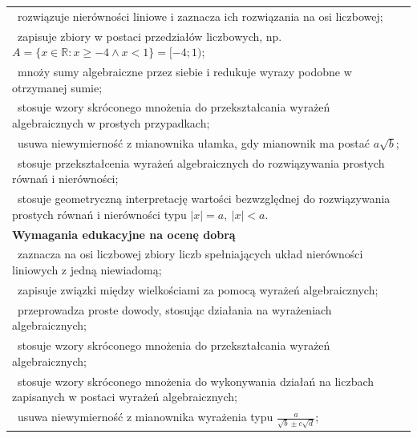 \documentclass[12pt,a4paper]{article}
\begin{document}
\begin{longtable}{|p{16cm}|}
		\textbullet\ rozwiązuje nierówności liniowe i zaznacza ich rozwiązania na osi liczbowej; \\
		
		\textbullet\ zapisuje zbiory w postaci przedziałów liczbowych, np. $A=\{x\in\mathbb{R}:x\geq -4\land x<1\}=[-4;1)$; \\
		
		\textbullet\ mnoży sumy algebraiczne przez siebie i redukuje wyrazy podobne w otrzymanej sumie; \\
		
		\textbullet\ stosuje wzory skróconego mnożenia do przekształcania wyrażeń algebraicznych w prostych przypadkach; \\
		
		\textbullet\ usuwa niewymierność z mianownika ułamka, gdy mianownik ma postać $a\sqrt{b}$; \\
		
		\textbullet\ stosuje przekształcenia wyrażeń algebraicznych do rozwiązywania prostych równań i nierówności; \\
		
		\textbullet\ stosuje geometryczną interpretację wartości bezwzględnej do rozwiązywania prostych równań i nierówności typu $|x|=a, \: |x|<a$. \\ \hline
		
		\textbf{Wymagania edukacyjne na ocenę dobrą} \\ \hline
		
		\textbullet\ zaznacza na osi liczbowej zbiory liczb spełniających układ nierówności liniowych z jedną niewiadomą; \\
		
		\textbullet\ zapisuje związki między wielkościami za pomocą wyrażeń algebraicznych; \\
		
		\textbullet\ przeprowadza proste dowody, stosując działania na wyrażeniach algebraicznych; \\
		
		\textbullet\ stosuje wzory skróconego mnożenia do przekształcania wyrażeń algebraicznych; \\
		
		\textbullet\ stosuje wzory skróconego mnożenia do wykonywania działań na liczbach zapisanych w postaci wyrażeń algebraicznych; \\
		
		\textbullet\ usuwa niewymierność z mianownika wyrażenia typu $\frac{a}{\sqrt{b}\pm c\sqrt{d}}$; \\
		

\end{longtable}
\end{document}

